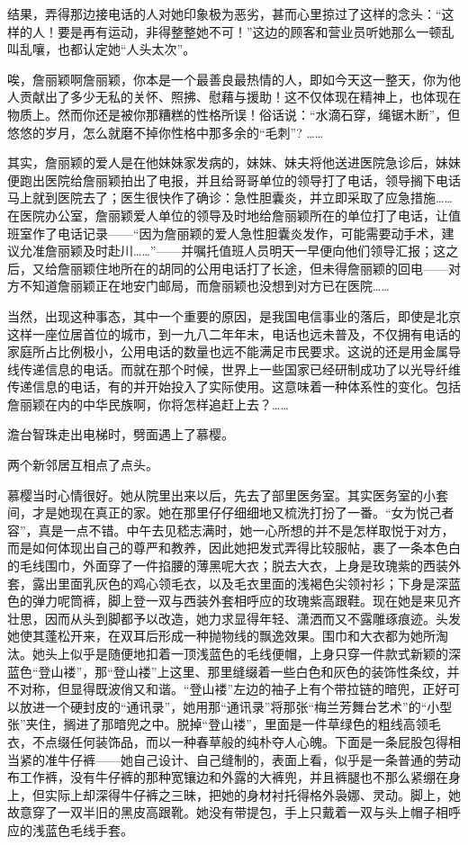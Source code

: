 \par 结果，弄得那边接电话的人对她印象极为恶劣，甚而心里掠过了这样的念头：“这样的人！要是再有运动，非得整整她不可！”这边的顾客和营业员听她那么一顿乱叫乱嚷，也都认定她“人头太次”。
\par 唉，詹丽颖啊詹丽颖，你本是一个最善良最热情的人，即如今天这一整天，你为他人贡献出了多少无私的关怀、照拂、慰藉与援助！这不仅体现在精神上，也体现在物质上。然而你还是被你那糟糕的性格所误！俗话说：“水滴石穿，绳锯木断”，但悠悠的岁月，怎么就磨不掉你性格中那多余的“毛刺”? ……
\par 其实，詹丽颖的爱人是在他妹妹家发病的，妹妹、妹夫将他送进医院急诊后，妹妹便跑出医院给詹丽颖拍出了电报，并且给哥哥单位的领导打了电话，领导搁下电话马上就到医院去了；医生很快作了确诊：急性胆囊炎，并立即采取了应急措施……在医院办公室，詹丽颖爱人单位的领导及时地给詹丽颖所在的单位打了电话，让值班室作了电话记录——“因为詹丽颖的爱人急性胆囊炎发作，可能需要动手术，建议允准詹丽颖及时赴川……”——并嘱托值班人员明天一早便向他们领导汇报；这之后，又给詹丽颖住地所在的胡同的公用电话打了长途，但未得詹丽颖的回电——对方不知道詹丽颖正在地安门邮局，而詹丽颖也没想到对方已在医院……
\par 当然，出现这种事态，其中一个重要的原因，是我国电信事业的落后，即使是北京这样一座位居首位的城市，到一九八二年年末，电话也远未普及，不仅拥有电话的家庭所占比例极小，公用电话的数量也远不能满足市民要求。这说的还是用金属导线传递信息的电话。而就在那个时候，世界上一些国家已经研制成功了以光导纤维传递信息的电话，有的并开始投入了实际使用。这意味着一种体系性的变化。包括詹丽颖在内的中华民族啊，你将怎样追赶上去？……
\par 澹台智珠走出电梯时，劈面遇上了慕樱。
\par 两个新邻居互相点了点头。
\par 慕樱当时心情很好。她从院里出来以后，先去了部里医务室。其实医务室的小套间，才是她现在真正的家。她在那里仔仔细细地又梳洗打扮了一番。“女为悦己者容”，真是一点不错。中午去见嵇志满时，她一心所想的并不是怎样取悦于对方，而是如何体现出自己的尊严和教养，因此她把发式弄得比较服帖，裹了一条本色白的毛线围巾，外面穿了一件掐腰的薄黑呢大衣；脱去大衣，上身是玫瑰紫的西装外套，露出里面乳灰色的鸡心领毛衣，以及毛衣里面的浅褐色尖领衬衫；下身是深蓝色的弹力呢筒裤，脚上登一双与西装外套相呼应的玫瑰紫高跟鞋。现在她是来见齐壮思，因而从头到脚都予以改造，她力求显得年轻、潇洒而又不露雕琢痕迹。头发她使其蓬松开来，在双耳后形成一种抛物线的飘逸效果。围巾和大衣都为她所淘汰。她头上似乎是随便地扣着一顶浅蓝色的毛线便帽，上身只穿一件款式新颖的深蓝色“登山褛”，那“登山褛”上这里、那里缝缀着一些白色和灰色的装饰性条纹，并不对称，但显得既波俏又和谐。“登山褛”左边的袖子上有个带拉链的暗兜，正好可以放进一个硬封皮的“通讯录”，她用那“通讯录”将那张“梅兰芳舞台艺术”的“小型张”夹住，搁进了那暗兜之中。脱掉“登山褛”，里面是一件草绿色的粗线高领毛衣，不点缀任何装饰品，而以一种春草般的纯朴夺人心魄。下面是一条屁股包得相当紧的准牛仔裤——她自己设计、自己缝制的，表面上看，似乎是一条普通的劳动布工作裤，没有牛仔裤的那种宽镶边和外露的大裤兜，并且裤腿也不那么紧绷在身上，但实际上却深得牛仔裤之三昧，把她的身材衬托得格外袅娜、灵动。脚上，她故意穿了一双半旧的黑皮高跟靴。她没有带提包，手上只戴着一双与头上帽子相呼应的浅蓝色毛线手套。
